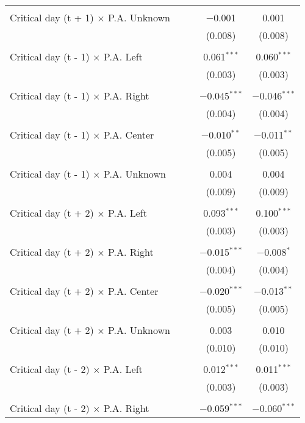 \documentclass[
]{article}
\begin{document}
\begin{table}[!htbp]
{\begin{tabular}{@{\extracolsep{5pt}}lcccc}
  & & & & \\ 
 Critical day (t + 1) $\times$ P.A. Unknown &  &  & $-$0.001 & 0.001 \\ 
  &  &  & (0.008) & (0.008) \\ 
  & & & & \\ 
 Critical day (t - 1) $\times$ P.A. Left &  &  & 0.061$^{***}$ & 0.060$^{***}$ \\ 
  &  &  & (0.003) & (0.003) \\ 
  & & & & \\ 
 Critical day (t - 1) $\times$ P.A. Right &  &  & $-$0.045$^{***}$ & $-$0.046$^{***}$ \\ 
  &  &  & (0.004) & (0.004) \\ 
  & & & & \\ 
 Critical day (t - 1) $\times$ P.A. Center &  &  & $-$0.010$^{**}$ & $-$0.011$^{**}$ \\ 
  &  &  & (0.005) & (0.005) \\ 
  & & & & \\ 
 Critical day (t - 1) $\times$ P.A. Unknown &  &  & 0.004 & 0.004 \\ 
  &  &  & (0.009) & (0.009) \\ 
  & & & & \\ 
 Critical day (t + 2) $\times$ P.A. Left &  &  & 0.093$^{***}$ & 0.100$^{***}$ \\ 
  &  &  & (0.003) & (0.003) \\ 
  & & & & \\ 
 Critical day (t + 2) $\times$ P.A. Right &  &  & $-$0.015$^{***}$ & $-$0.008$^{*}$ \\ 
  &  &  & (0.004) & (0.004) \\ 
  & & & & \\ 
 Critical day (t + 2) $\times$ P.A. Center &  &  & $-$0.020$^{***}$ & $-$0.013$^{**}$ \\ 
  &  &  & (0.005) & (0.005) \\ 
  & & & & \\ 
 Critical day (t + 2) $\times$ P.A. Unknown &  &  & 0.003 & 0.010 \\ 
  &  &  & (0.010) & (0.010) \\ 
  & & & & \\ 
 Critical day (t - 2) $\times$ P.A. Left &  &  & 0.012$^{***}$ & 0.011$^{***}$ \\ 
  &  &  & (0.003) & (0.003) \\ 
  & & & & \\ 
 Critical day (t - 2) $\times$ P.A. Right &  &  & $-$0.059$^{***}$ & $-$0.060$^{***}$ \\ 

\end{tabular}}
\end{table}
\end{document}
